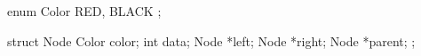enum Color { RED, BLACK };

struct Node {
    Color color;
    int data;
    Node *left;
    Node *right;
    Node *parent;
};
